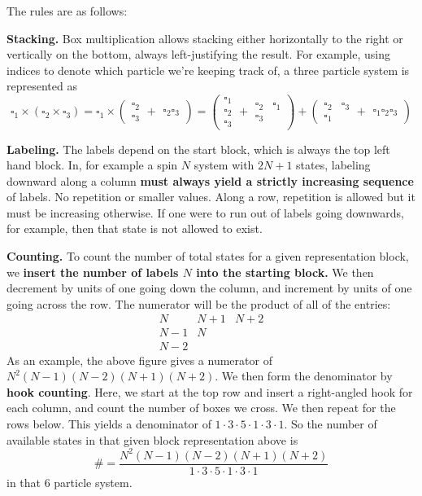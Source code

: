 \documentclass[fontsize=12pt]{scrartcl}
\begin{document}
The rules are as follows:

\textbf{Stacking.} Box multiplication allows stacking either horizontally to the right or vertically on the bottom, always left-justifying the result. For example, using indices to denote which particle we're keeping track of, a three particle system is represented as $$\square_1\times(\square_2\times\square_3)=\square_1\times\left(\begin{matrix}
\square_2\\\square_3
\end{matrix}+\begin{matrix}
\square_2\square_3
\end{matrix}\right) = \left(\begin{matrix}
\square_1\\\square_2\\\square_3
\end{matrix}+\begin{matrix}
\square_2& \square_1 \\\square_3 & 
\end{matrix}\right) + \left(\begin{matrix}
\square_2 & \square_3\\\square_1 &
\end{matrix}+\begin{matrix}
\square_1\square_2\square_3
\end{matrix}\right)$$


\textbf{Labeling.} The labels depend on the start block, which is always the top left hand block. In, for example a spin $N$ system with $2N+1$ states, labeling downward along a column \textbf{must always yield a strictly increasing sequence} of labels. No repetition or smaller values. Along a row, repetition is allowed but it must be increasing otherwise. If one were to run out of labels going downwards, for example, then that state is not allowed to exist.

\textbf{Counting.} To count the number of total states for a given representation block, we \textbf{insert the number of labels $N$ into the starting block.} We then decrement by units of one going down the column, and increment by units of one going across the row. The numerator will be the product of all of the entries: $$\begin{matrix}
\boxed{N} & \boxed{N+1}&\boxed{N+2}\\
\boxed{N-1} & \boxed{N} & \\
\boxed{N-2} &&
\end{matrix}$$ As an example, the above figure gives a numerator of $N^2(N-1)(N-2)(N+1)(N+2)$. We then form the denominator by \textbf{hook counting}. Here, we start at the top row and insert a right-angled hook for each column, and count the number of boxes we cross. We then repeat for the rows below. This yields a denominator of $1\cdot 3\cdot 5\cdot 1\cdot 3 \cdot 1$. So the number of available states in that given block representation above is $$\# = \frac{N^2(N-1)(N-2)(N+1)(N+2)}{1\cdot3\cdot5\cdot1\cdot3\cdot1}$$ in that 6 particle system.
\end{document}
